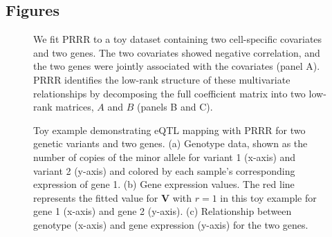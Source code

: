 \documentclass{bmcart}
\begin{document}
\begin{backmatter}




\section*{Figures}

\begin{figure}%
\centering
\caption{ We fit PRRR to a toy dataset containing two cell-specific covariates and two genes. The two covariates showed negative correlation, and the two genes were jointly associated with the covariates (panel A). PRRR identifies the low-rank structure of these multivariate relationships by decomposing the full coefficient matrix into two low-rank matrices, $A$ and $B$ (panels B and C).}
\label{fig:fig1}
\end{figure}

\begin{figure}%
\centering
\caption{ Toy example demonstrating eQTL mapping with PRRR for two genetic variants and two genes. 
(a) Genotype data, shown as the number of copies of the minor allele for variant 1 (x-axis) and variant 2 (y-axis) and colored by each sample's corresponding expression of gene 1. 
(b) Gene expression values. The red line represents the fitted value for $\mathbf{V}$ with $r=1$ in this toy example for gene 1 (x-axis) and gene 2 (y-axis).
(c) Relationship between genotype (x-axis) and gene expression (y-axis) for the two genes.
}
\label{fig:toy_example_sceqtl}
\end{figure}


\end{backmatter}
\end{document}

